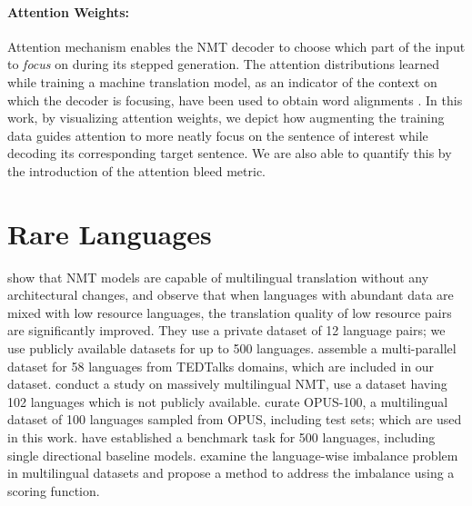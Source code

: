 \paragraph{Attention Weights:} Attention mechanism \cite{Bahdanau-2015-nmt} enables the NMT decoder to choose which part of the input to \textit{focus} on during its stepped generation. The attention distributions learned while training a machine translation model, as an indicator of the context on which the decoder is focusing, have been used to obtain word alignments \cite{garg-etal-2019-jointly,DBLP:journals/corr/abs-1901-11359,zenkel-etal-2020-end,chen-etal-2020-accurate}. In this work, by visualizing attention weights, we depict how augmenting the training data guides attention to more neatly focus on the sentence of interest while decoding its corresponding target sentence. We are also able to quantify this by the introduction of the attention bleed metric.


\section{Rare Languages}

\citet{johnson-etal-2017-googleNMT} show that NMT models are capable of multilingual translation without any architectural changes, and observe that when languages with abundant data are mixed with low resource languages, the translation quality of low resource pairs are significantly improved. They use a private dataset of 12 language pairs; we use publicly available datasets for up to 500 languages. %
\citet{qi-etal-2018-pretrainemb} assemble a multi-parallel dataset for 58 languages from TEDTalks domains, which are included in our dataset. 
\citet{aharoni-etal-2019-massively} conduct a study on massively multilingual NMT, use a dataset having 102 languages which is not publicly available.
\citet{zhang-etal-2020-multiling-nmt} curate OPUS-100, a multilingual dataset of 100 languages sampled from OPUS, including test sets; which are used in this work.
\citet{tiedemann-2020-tatoeba} have established a benchmark task for 500 languages, including single directional baseline models.
\citet{wang-etal-2020-balancing} examine the language-wise imbalance problem in multilingual datasets and propose a method to address the imbalance using a scoring function.


